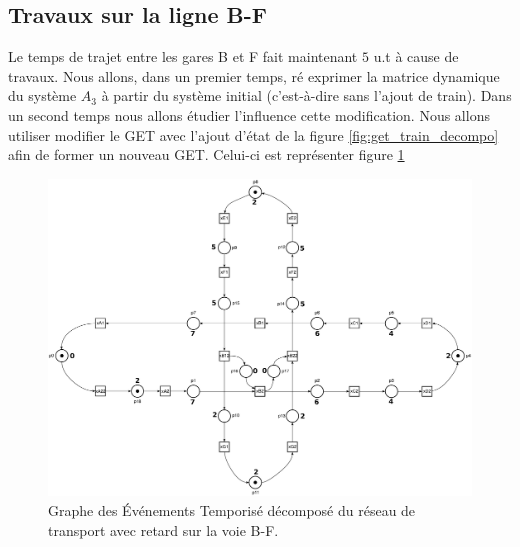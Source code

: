 \subsection{Travaux sur la ligne B-F}
Le temps de trajet entre les gares B et F fait maintenant $5$ u.t à cause de travaux.
Nous allons, dans un premier temps, ré exprimer la matrice dynamique du système $A_3$ à partir du système initial (c'est-à-dire sans l'ajout de train). Dans un second temps nous allons étudier l'influence cette modification.
Nous allons utiliser modifier le GET avec l'ajout d'état de la figure \ref{fig:get_train_decompo} afin de former un nouveau GET. Celui-ci est représenter figure \ref{fig:get_train_decompoRetard}
\begin{figure}[!ht]
\centering
\includegraphics[width = .8\textwidth]{./I/images/train_decomposeRetard.pdf}
\caption{\label{fig:get_train_decompoRetard} Graphe des Événements Temporisé décomposé du réseau de transport avec retard sur la voie B-F.}
\end{figure}

